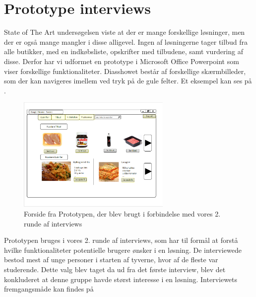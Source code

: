 \section{Prototype interviews}\label{section:interview2}
State of The Art undersøgelsen viste at der er mange forskellige løsninger, men der er også mange mangler i disse alligevel.
Ingen af løsningerne tager tilbud fra alle butikker, med en indkøbsliste, opskrifter med tilbudene, samt vurdering af disse.
Derfor har vi udformet en prototype i Microsoft Office Powerpoint som viser forskellige funktionaliteter. 
Diasshowet består af forskellige skærmbilleder, som der kan navigeres imellem ved tryk på de gule felter.
Et eksempel kan ses på .

\begin{figure}
\vspace{-20pt}
	\begin{center}
		\includegraphics[width=0.66\textwidth]{images/Images/prototype-forside.PNG}
	\end{center}
	\vspace{-20pt}
	\caption{Forside fra Prototypen, der blev brugt i forbindelse med vores 2. runde af interviews}\label{ss:Prototype}
	\vspace{-20pt}
\end{figure}

Prototypen bruges i vores 2. runde af interviews, som har til formål at forstå hvilke funktionaliteter potentielle brugere ønsker i en løsning.
De interviewede bestod mest af unge personer i starten af tyverne, hvor af de fleste var studerende.
Dette valg blev taget da ud fra det første interview, blev det konkluderet at denne gruppe havde størst interesse i en løsning.
Interviewets fremgangsmåde kan findes på 


